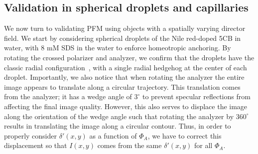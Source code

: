 \subsection{Validation in spherical droplets and capillaries}
We now turn to validating PFM using objects with a spatially varying director field.
We start by considering spherical droplets of the Nile red-doped 5CB in water, with 8 mM SDS in the water to enforce homeotropic anchoring.
By rotating the crossed polarizer and analyzer, we confirm that the droplets have the classic radial configuration~\cite{RN177}, with a single radial hedgehog at the center of each droplet.
Importantly, we also notice that when rotating the analyzer the entire image appears to translate along a circular trajectory.
This translation comes from the analyzer; it has a wedge angle of $3^{\circ}$ to prevent specular reflections from affecting the final image quality.
However, this also serves to displace the image along the orientation of the wedge angle such that rotating the analyzer by $360^{\circ}$ results in translating the image along a circular contour.
Thus, in order to properly consider $\delta'(x,y)$ as a function of $\Phi_A$, we have to correct this displacement so that $I(x,y)$ comes from the same $\delta'(x,y)$ for all $\Phi_A$.

